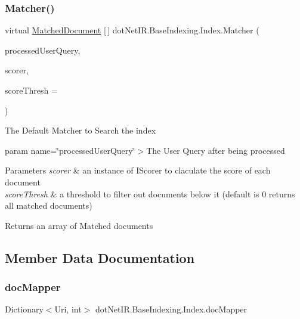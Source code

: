\subsubsection{\texorpdfstring{Matcher()}{Matcher()}}
{\footnotesize\ttfamily virtual \hyperlink{classdot_net_i_r_1_1_base_querying_1_1_matched_document}{Matched\+Document} \mbox{[}$\,$\mbox{]} dot\+Net\+I\+R.\+Base\+Indexing.\+Index.\+Matcher (\begin{DoxyParamCaption}\item[{object}]{processed\+User\+Query,  }\item[{\hyperlink{interfacedot_net_i_r_1_1_base_querying_1_1_i_scorer}{I\+Scorer}}]{scorer,  }\item[{double}]{score\+Thresh = {} }\end{DoxyParamCaption})\hspace{0.3cm}{\ttfamily [virtual]}}



The Default Matcher to Search the index 

param name=\char`\"{}processed\+User\+Query\char`\"{}$>$The User Query after being processed


\begin{DoxyParams}{Parameters}
{\em scorer} & an instance of I\+Scorer to claculate the score of each document\\
\hline
{\em score\+Thresh} & a threshold to filter out documents below it (default is 0 returns all matched documents)\\
\hline
\end{DoxyParams}
\begin{DoxyReturn}{Returns}
an array of Matched documents
\end{DoxyReturn}


\subsection{Member Data Documentation}
\hypertarget{classdot_net_i_r_1_1_base_indexing_1_1_index_a35e48f0af6a704545fa171622c8739b9}{}\label{classdot_net_i_r_1_1_base_indexing_1_1_index_a35e48f0af6a704545fa171622c8739b9} 
\subsubsection{\texorpdfstring{doc\+Mapper}{docMapper}}
{\footnotesize\ttfamily Dictionary$<$Uri, int$>$ dot\+Net\+I\+R.\+Base\+Indexing.\+Index.\+doc\+Mapper\hspace{0.3cm}{\ttfamily [protected]}}



